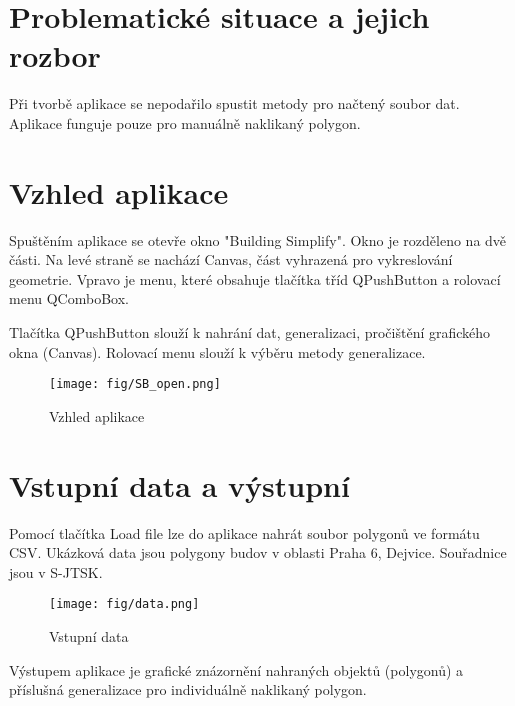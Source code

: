 \documentclass[oneside,12pt,a4paper]{book}
\begin{document}
\bigskip

\chapter{Problematické situace a jejich rozbor} 
Při tvorbě aplikace se nepodařilo spustit metody pro načtený soubor dat. Aplikace funguje pouze pro manuálně naklikaný polygon.\par



\chapter{Vzhled aplikace}
Spuštěním aplikace se otevře okno "Building Simplify". Okno je rozděleno na dvě části. Na levé straně se nachází Canvas, část vyhrazená pro vykreslování geometrie. Vpravo je menu, které obsahuje tlačítka tříd QPushButton a rolovací menu QComboBox.\par
Tlačítka QPushButton slouží k nahrání dat, generalizaci, pročištění grafického okna (Canvas). Rolovací menu slouží k výběru metody generalizace.


\begin{figure}[ht!]
    \centering
    \texttt{[image: fig/SB\_open.png]}
    \caption{Vzhled aplikace}
    \label{fig:Zadání úlohy}
\end{figure}


\chapter{Vstupní data a výstupní} 
Pomocí tlačítka Load file lze do aplikace nahrát soubor polygonů ve formátu CSV. Ukázková data jsou polygony budov v oblasti Praha 6, Dejvice. Souřadnice jsou v S-JTSK. \par

\begin{figure}[ht!]
    \centering
    \texttt{[image: fig/data.png]}
    \caption{Vstupní data}
    \label{fig:Zadání úlohy}
\end{figure}


Výstupem aplikace je grafické znázornění nahraných objektů (polygonů) a příslušná generalizace pro individuálně naklikaný polygon.
\end{document}
